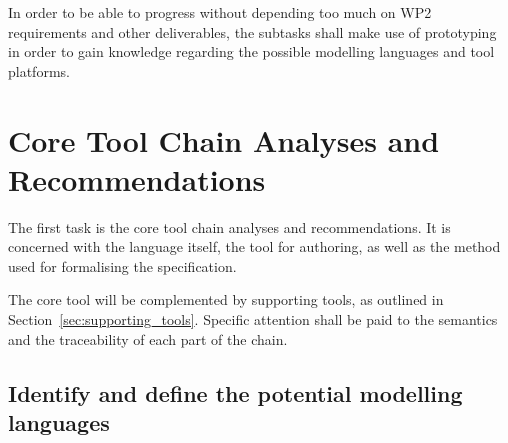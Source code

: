 \documentclass[11pt, a4paper]{article}
\let\oldmarginpar\marginpar
\renewcommand\marginpar[1]{\-\oldmarginpar[\raggedleft\scriptsize #1]%
{\raggedright\scriptsize #1}}
\begin{document}
In order to be able to progress without depending too much on WP2 requirements and other deliverables, the subtasks shall make use of prototyping in order to gain knowledge regarding the possible modelling languages and tool platforms.  

\section{Core Tool Chain Analyses and Recommendations}
\label{sec:core_tool}
The first task is the core tool chain analyses and recommendations. It is concerned with the language itself, the tool for authoring, as well as the method used for formalising the specification.

The core tool will be complemented by supporting tools, as outlined in Section~\ref{sec:supporting_tools}.
Specific attention shall be paid to the semantics and the traceability of each part of the chain.




\subsection{Identify and define the potential modelling languages}
\label{sec:language}
\end{document}
